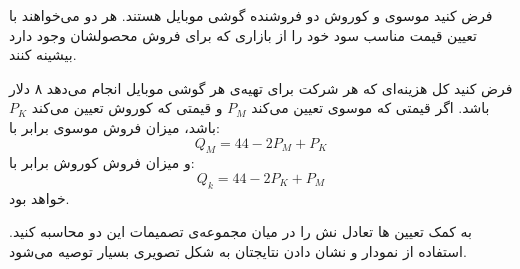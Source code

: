 فرض کنید موسوی و کوروش دو فروشنده گوشی موبایل هستند. هر دو می‌خواهند با تعیین قیمت مناسب سود خود را از بازاری که برای فروش محصولشان وجود دارد بیشینه کنند.
\vspace{2pt}

فرض کنید کل هزینه‌ای که هر شرکت برای تهیه‌ی هر گوشی موبایل انجام می‌دهد ۸ دلار باشد. اگر قیمتی که موسوی تعیین می‌کند
$P_M$
و قیمتی که کوروش تعیین می‌کند
$P_K$
باشد، میزان فروش موسوی برابر با:
$$Q_M = 44 - 2 P_M + P_K$$
و میزان فروش کوروش برابر با:
$$Q_k = 44 - 2 P_K + P_M$$
خواهد بود.
\vspace{2pt}

به کمک تعیین
ها تعادل نش را در میان مجموعه‌ی تصمیمات این دو محاسبه کنید. استفاده از نمودار و نشان دادن نتایجتان به شکل تصویری بسیار توصیه می‌شود.
